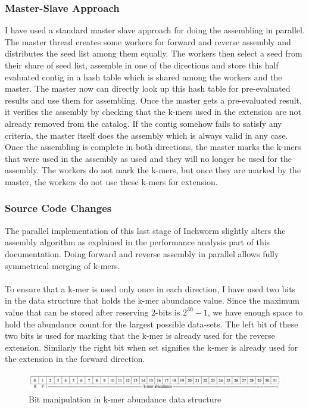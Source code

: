 \label{key}\documentclass[plainarticle, english ,zihtitle,final,hyperref,utf8]{zihpub}
\begin{document}
\subsubsection{Master-Slave Approach}
I have used a standard master slave approach for doing the assembling in parallel. The master thread creates some workers for forward and reverse assembly and distributes the seed list among them equally. The workers then select a seed from their share of seed list, assemble in one of the directions and store this half evaluated contig in a hash table which is shared among the workers and the master. The master now can directly look up this hash table for pre-evaluated results and use them for assembling. Once the master gets a pre-evaluated result, it verifies the assembly by checking that the k-mers used in the extension are not already removed from the catalog. If the contig somehow fails to satisfy any criteria, the master itself does the assembly which is always valid in any case. Once the assembling is complete in both directions, the master marks the k-mers that were used in the assembly as used and they will no longer be used for the assembly. The workers do not mark the k-mers, but once they are marked by the master, the workers do not use these k-mers for extension.
\subsubsection{Source Code Changes}
The parallel implementation of this last stage of Inchworm slightly alters the assembly algorithm as explained in the performance analysis part of this documentation. Doing forward and reverse assembly in parallel allows fully symmetrical merging of k-mers. 
\paragraph{}
To ensure that a k-mer is used only once in each direction, I have used two bits in the data structure that holds the k-mer abundance value. Since the maximum value that can be stored after reserving 2-bits is $2^{30}-1$, we have enough space to hold the abundance count for the largest possible data-sets. The left bit of these two bits is used for marking that the k-mer is already used for the reverse extension. Similarly the right bit when set signifies the k-mer is already used for the extension in the forward direction.
\begin{figure}[h]
\center
\includegraphics[scale=0.5]{bit}
\caption{Bit manipulation in k-mer abundance data structure}
\label{bit}
\end{figure}
\end{document}
